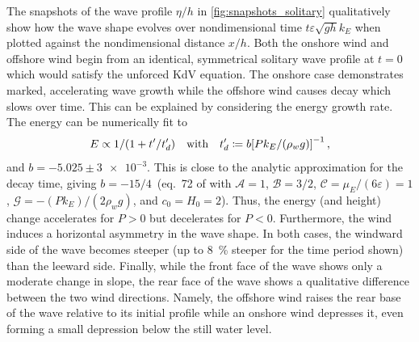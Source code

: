 \documentclass{jfm}
\renewcommand*{\epsilon}{\varepsilon}
\begin{document}
The snapshots of the wave profile $\eta/h$ in
\cref{fig:snapshots_solitary} qualitatively show how the wave shape
evolves over nondimensional time $t \epsilon \sqrt{g h} k_E$ when
plotted against the nondimensional distance $x/h$.
Both the onshore wind  and offshore
wind  begin from an identical,
symmetrical solitary wave profile at $t=0$ which would satisfy the
unforced KdV equation.
The onshore case  demonstrates
marked, accelerating wave growth while the offshore wind
 causes decay which slows over time.
This can be explained by considering the energy growth rate.
The energy can be numerically fit to
\begin{equation}
  E \propto 1/\pqty{1 + t'/t_d'}
  \qq{with}
  t_d' \coloneqq b \bqty{P k_E/(\rho_w g)}^{-1}
  \,,
  \label{eq:actual_energy}
\end{equation}
and $b = -5.025 \pm \num{3e-3}$.
This is close to the analytic approximation for the decay time, giving
$b = -15/4$~(\eg eq.\ 72 of \citealp{zdyrski2019effects} with
$\mathcal{A}=1$, $\mathcal{B} = 3/2$, $\mathcal{C} = \mu_E/(6\epsilon) =
1$, $\mathcal{G} = -(P k_E)/(2 \rho_w g)$, and $c_0 = H_0 = 2$).
Thus, the energy (and height) change accelerates for $P>0$ but
decelerates for $P<0$.
Furthermore, the wind induces a horizontal asymmetry in the wave shape.
In both cases, the windward side of the wave becomes steeper (up to
\SI{8}{\percent} steeper for the time period shown) than the leeward
side.
Finally, while the front face of the wave shows only a moderate change in
slope, the rear face of the wave shows a qualitative difference between
the two wind directions.
Namely, the offshore wind raises the rear base of the wave relative to
its initial profile while an onshore wind depresses it, even forming a
small depression below the still water level.
\end{document}
